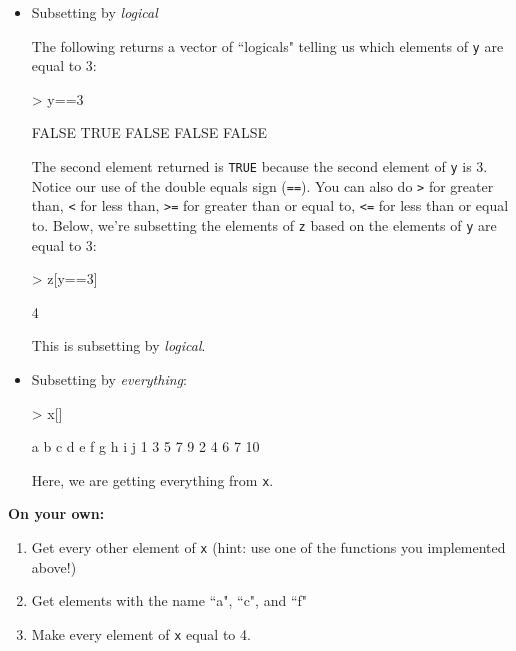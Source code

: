 \documentclass[answers]{exam}
\begin{document}
\begin{itemize}
\item Subsetting by \textit{logical}

The following returns a vector of ``logicals" telling us which elements of \texttt{y} are equal to 3:
\begin{Schunk}
\begin{Sinput}
> y==3  
\end{Sinput}
\begin{Soutput}
[1] FALSE  TRUE FALSE FALSE FALSE
\end{Soutput}
\end{Schunk}
The second element returned is \texttt{TRUE} because the second element of \texttt{y} is 3. Notice our use of the double equals sign (\texttt{==}). You can also do \texttt{>} for greater than, \texttt{<} for less than, \texttt{>=} for greater than or equal to, \texttt{<=} for less than or equal to.  Below, we're subsetting the elements of \texttt{z} based on the elements of \texttt{y} are equal to 3:
\begin{Schunk}
\begin{Sinput}
> z[y==3]  
\end{Sinput}
\begin{Soutput}
[1] 4
\end{Soutput}
\end{Schunk}
This is subsetting by \textit{logical}.

\item Subsetting by \textit{everything}:
\begin{Schunk}
\begin{Sinput}
> x[]  
\end{Sinput}
\begin{Soutput}
 a  b  c  d  e  f  g  h  i  j 
 1  3  5  7  9  2  4  6  7 10 
\end{Soutput}
\end{Schunk}
Here, we are getting everything from \texttt{x}.
\end{itemize}

\noindent\textbf{On your own:}

\begin{enumerate}
\item Get every other element of \texttt{x} (hint: use one of the functions you implemented above!)
\item Get elements with the name ``a", ``c", and ``f"
\item Make every element of \texttt{x} equal to 4.
\end{enumerate}
\end{document}

